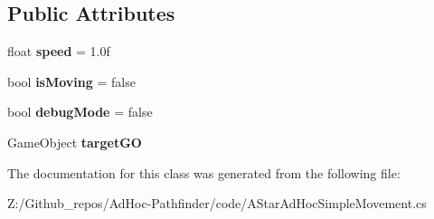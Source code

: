 \subsection*{Public Attributes}
\begin{DoxyCompactItemize}
\item 
\hypertarget{class_a_star_ad_hoc_simple_movement_a5f9b53189df1d5b040206d2ce967cd59}{float {\bfseries speed} = 1.\+0f}\label{class_a_star_ad_hoc_simple_movement_a5f9b53189df1d5b040206d2ce967cd59}

\item 
\hypertarget{class_a_star_ad_hoc_simple_movement_a11913c5cc0e4a1e4ecf76c1270475202}{bool {\bfseries is\+Moving} = false}\label{class_a_star_ad_hoc_simple_movement_a11913c5cc0e4a1e4ecf76c1270475202}

\item 
\hypertarget{class_a_star_ad_hoc_simple_movement_a0f2745c874b2589caa4dab61e05f0b16}{bool {\bfseries debug\+Mode} = false}\label{class_a_star_ad_hoc_simple_movement_a0f2745c874b2589caa4dab61e05f0b16}

\item 
\hypertarget{class_a_star_ad_hoc_simple_movement_a783f7c2da13202c27f1f2b458e767765}{Game\+Object {\bfseries target\+G\+O}}\label{class_a_star_ad_hoc_simple_movement_a783f7c2da13202c27f1f2b458e767765}

\end{DoxyCompactItemize}


The documentation for this class was generated from the following file\+:\begin{DoxyCompactItemize}
\item 
Z\+:/\+Github\+\_\+repos/\+Ad\+Hoc-\/\+Pathfinder/code/A\+Star\+Ad\+Hoc\+Simple\+Movement.\+cs\end{DoxyCompactItemize}
